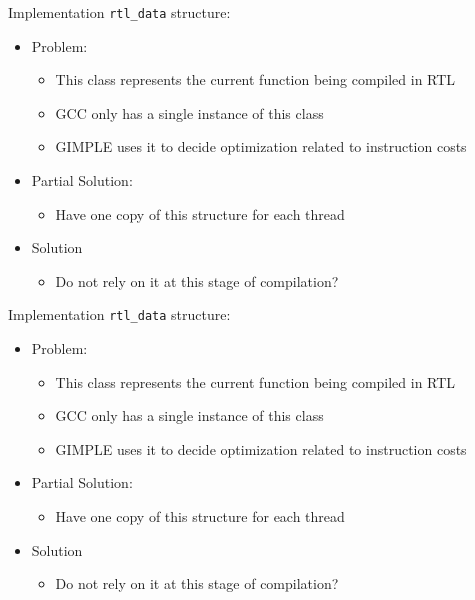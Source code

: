 \begin{frame}{Implementation}
    \texttt{rtl\_data} structure: 
    \begin{itemize}
        \item Problem: 
            \begin{itemize}
                \item This class represents the current function being compiled in RTL
                \item GCC only has a single instance of this class
                \item GIMPLE uses it to decide optimization related to instruction costs
            \end{itemize}
        \item Partial Solution:
            \begin{itemize}
                \item Have one copy of this structure for each thread 
            \end{itemize}
        \item Solution 
            \begin{itemize}
                \item Do not rely on it at this stage of compilation? 
            \end{itemize}
    \end{itemize}
\end{frame}

\begin{frame}{Implementation}
    \texttt{rtl\_data} structure:
    \begin{itemize}
        \item Problem: 
            \begin{itemize}
                \item This class represents the current function being compiled in RTL
                \item GCC only has a single instance of this class
                \item GIMPLE uses it to decide optimization related to instruction costs
            \end{itemize}
        \item Partial Solution:
            \begin{itemize}
                \item Have one copy of this structure for each thread 
            \end{itemize}
        \item Solution 
            \begin{itemize}
                \item Do not rely on it at this stage of compilation? 
            \end{itemize}
    \end{itemize}
\end{frame}

